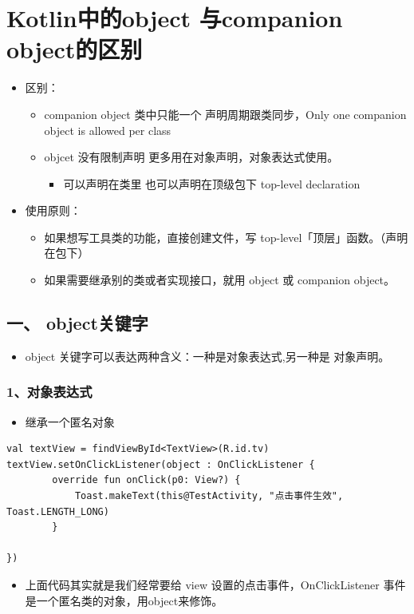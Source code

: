 \documentclass[9pt, b5paper]{article}
\begin{document}
\section{Kotlin中的object 与companion object的区别}
\label{sec-3}
\begin{itemize}
\item 区别：
\begin{itemize}
\item companion object 类中只能一个 声明周期跟类同步，Only one companion object is allowed per class
\item objcet 没有限制声明  更多用在对象声明，对象表达式使用。
\begin{itemize}
\item 可以声明在类里  也可以声明在顶级包下 top-level declaration
\end{itemize}
\end{itemize}
\item 使用原则：       
\begin{itemize}
\item 如果想写工具类的功能，直接创建文件，写 top-level「顶层」函数。（声明在包下）
\item 如果需要继承别的类或者实现接口，就用 object 或 companion object。
\end{itemize}
\end{itemize}

\subsection{一、 object关键字}
\label{sec-3-1}
\begin{itemize}
\item object 关键字可以表达两种含义：一种是对象表达式,另一种是 对象声明。
\end{itemize}
\subsubsection{1、对象表达式}
\label{sec-3-1-1}
\begin{itemize}
\item 继承一个匿名对象
\end{itemize}
\begin{verbatim}
val textView = findViewById<TextView>(R.id.tv)
textView.setOnClickListener(object : OnClickListener {
        override fun onClick(p0: View?) {
            Toast.makeText(this@TestActivity, "点击事件生效", Toast.LENGTH_LONG)
        }
 
})
\end{verbatim}
\begin{itemize}
\item 上面代码其实就是我们经常要给 view 设置的点击事件，OnClickListener 事件是一个匿名类的对象，用object来修饰。
\end{itemize}
\end{document}
